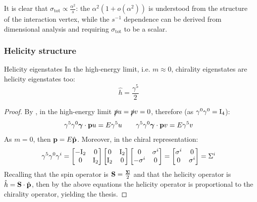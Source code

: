 It is clear that $ \sigma_\text{tot} \propto \frac{\alpha^2}{s} $: the $ \alpha^2 \left( 1 + o(\alpha^2) \right) $ is understood from the structure of the interaction vertex, while the $ s^{-1} $ dependence can be derived from dimensional analysis and requiring $ \sigma_\text{tot} $ to be a scalar.

\subsubsection{Helicity structure}

\begin{proposition}{Helicity eigenstates}{}
  In the high-energy limit, i.e. $ m \approx 0 $, chirality eigenstates are helicity eigenstates too:
  \begin{equation}
    \hat{h} = \frac{\gamma^5}{2}
  \end{equation}
\end{proposition}

\begin{proofbox}
  \begin{proof}
    By , in the high-energy limit $ \slashed{p} u = \slashed{p} v = 0 $, therefore (as $ \gamma^0 \gamma^0 = \mathrm{I}_4 $):
    \begin{equation*}
      \gamma^5 \gamma^0 \boldsymbol{\gamma} \cdot \mathbf{p} u = E \gamma^5 u
      \qquad
      \gamma^5 \gamma^0 \boldsymbol{\gamma} \cdot \mathbf{p} v = E \gamma^5 v
    \end{equation*}
    As $ m = 0 $, then $ \mathbf{p} = E \hat{\mathbf{p}} $. Moreover, in the chiral representation:
    \begin{equation*}
      \gamma^5 \gamma^0 \gamma^i =
      \begin{bmatrix}
        - \mathrm{I}_2 & 0 \\
        0 & \mathrm{I}_2
      \end{bmatrix}
      \begin{bmatrix}
        0 & \mathrm{I}_2 \\
        \mathrm{I}_2 & 0
      \end{bmatrix}
      \begin{bmatrix}
        0 & \sigma^i \\
        - \sigma^i & 0
      \end{bmatrix}
      =
      \begin{bmatrix}
        \sigma^i & 0 \\
        0 & \sigma^i
      \end{bmatrix}
      = \Sigma^i
    \end{equation*}
    Recalling that the spin operator is $ \mathbf{S} = \frac{\boldsymbol{\Sigma}}{2} $ and that the helicity operator is $ \hat{h} = \mathbf{S} \cdot \hat{\mathbf{p}} $, then by the above equations the helicity operator is proportional to the chirality operator, yielding the thesis.
  \end{proof}
\end{proofbox}


